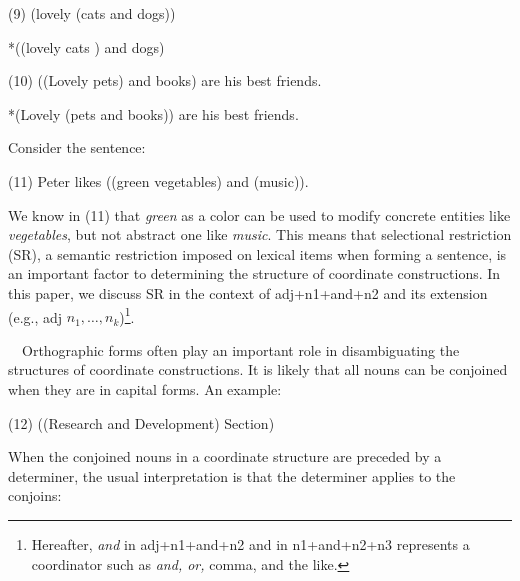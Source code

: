  \hspace*{5mm}    (9) (lovely (cats and dogs))

 \hspace*{9mm}      *((lovely cats ) and dogs)


 \hspace*{5mm}    (10) ((Lovely pets) and books) are his best friends.

 \hspace*{11mm}       *(Lovely (pets and books)) are his best friends.

\vspace*{3mm}	
\hspace*{-5mm}{\bf Selectional Restrictions} \hspace*{4mm}Consider the sentence:


 \vspace*{4mm}

 \hspace*{5mm}(11) Peter likes ((green vegetables) and (music)).


 \vspace*{4mm}
\hspace*{-5mm}We know in (11) that {\it green} as a color can be used to modify 
concrete entities like {\it vegetables}, but not abstract one like
{\it music}. This means that selectional restriction (SR),  a
semantic restriction imposed on lexical items when
forming a sentence, is an important factor to determining the structure
of coordinate constructions.  In this paper, we discuss SR in the
context of adj+n1+and+n2 and its extension (e.g.,
adj $n_{1}, \ldots, n_{k}$)\footnote{Hereafter, {\it and} in adj+n1+and+n2 and 
in n1+and+n2+n3 represents
a coordinator such as {\it and, or,} comma, and the like.}.

\vspace*{3mm}
\hspace*{-5mm}{\bf Other Linguistic Cues}　\hspace*{4mm}Orthographic forms often play
an important role in disambiguating the structures of coordinate
constructions.  It is likely that all nouns can be conjoined when  they are in capital 
forms. An example:  


\vspace*{4mm}

\hspace*{5mm}(12) ((Research and Development) Section)

\vspace*{4mm}

When the conjoined nouns in a coordinate structure are preceded 
by a determiner, the usual
interpretation is that the determiner applies to the conjoins:


